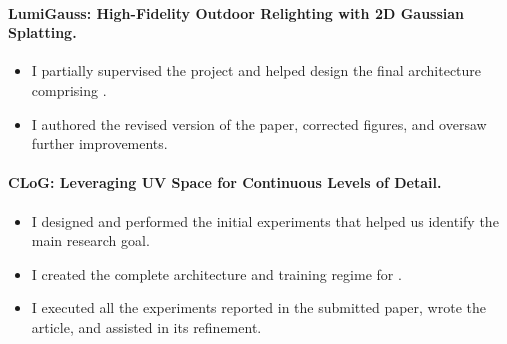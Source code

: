 {  \paragraph{LumiGauss: High-Fidelity Outdoor Relighting with 2D Gaussian Splatting.}
    \begin{itemize}
      \item I partially supervised the project and helped design the final architecture
            comprising \lumigauss.
      \item I authored the revised version of the paper, corrected figures, and
            oversaw further improvements.
    \end{itemize}

  \paragraph{CLoG: Leveraging UV Space for Continuous Levels of Detail.}
    \begin{itemize}
      \item I designed and performed the initial experiments that helped us identify
            the main research goal.
      \item I created the complete architecture and training regime for \clog.
      \item I executed all the experiments reported in the submitted paper, wrote
            the article, and assisted in its refinement.
    \end{itemize}

    }